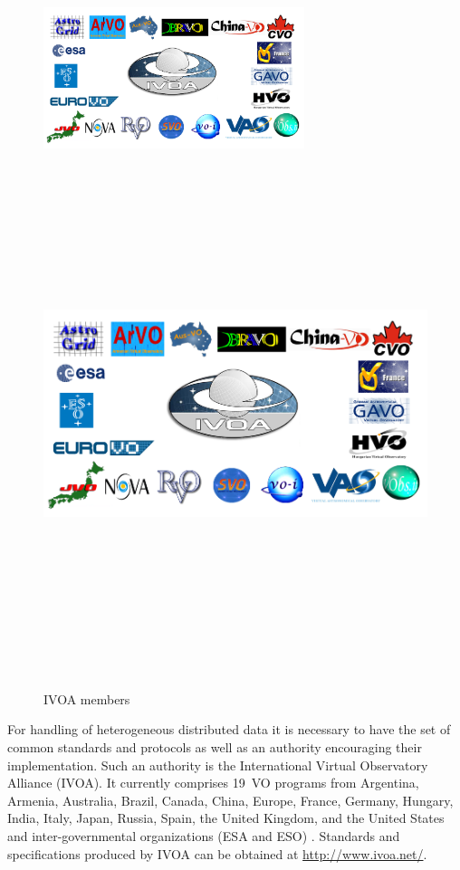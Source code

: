    \begin{figure}
     \vspace{0pt}
     \begin{center}
       \ifpdf
       \includegraphics[width=0.68\textwidth]{ivoamembers}
       \else
       \includegraphics[bb = 92 86 545 742, height=6in]{ivoamembers.jpg}
       \fi
     \end{center}
     \vspace{-15pt}
     \caption{IVOA members}
     \vspace{-5pt}
   \end{figure}


   For handling of heterogeneous distributed data it is necessary to
   have the set of common standards and protocols as well as an
   authority encouraging their implementation. Such an authority is
   the International Virtual Observatory Alliance (IVOA). It currently
   comprises 19~VO programs from Argentina, Armenia, Australia,
   Brazil, Canada, China, Europe, France, Germany, Hungary, India,
   Italy, Japan, Russia, Spain, the United Kingdom, and the United
   States and inter-governmental organizations (ESA and ESO)
   \citep{hanisch2010international}. Standards and specifications
   produced by IVOA can be obtained at \url{http://www.ivoa.net/}.

